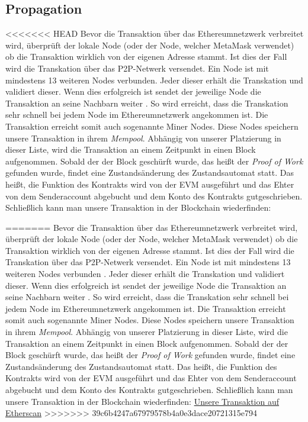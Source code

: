 \documentclass[runningheads]{llncs}
\begin{document}
\subsection{Propagation}
<<<<<<< HEAD
Bevor die Transaktion über das Ethereumnetzwerk verbreitet wird, überprüft der lokale Node (oder der Node, welcher MetaMask verwendet) ob die Transaktion wirklich von der eigenen Adresse stammt. Ist dies der Fall wird die Transkation über das P2P-Netwerk versendet. Ein Node ist mit mindestens 13 weiteren Nodes verbunden\cite[S.123]{antonopoulos_mastering_2019}. Jeder dieser erhält die Transkation und validiert dieser. Wenn dies erfolgreich ist sendet der jeweilige Node die Transaktion an seine Nachbarn weiter \cite[S.123]{antonopoulos_mastering_2019}. So wird erreicht, dass die Transkation sehr schnell bei jedem Node im Ethereumnetzwerk angekommen ist. Die Transaktion erreicht somit auch sogenannte Miner Nodes. Diese Nodes speichern unsere Transaktion in ihrem \textit{Mempool}. Abhängig von unserer Platzierung in dieser Liste, wird die Transaktion an einem Zeitpunkt in einen Block aufgenommen. Sobald der der Block geschürft wurde, das heißt der \textit{Proof of Work} gefunden wurde, findet eine Zustandsänderung des Zustandsautomat statt. Das heißt, die Funktion des Kontrakts wird von der EVM ausgeführt und das Ehter von dem Senderaccount abgebucht und dem Konto des Kontrakts gutgeschrieben. Schließlich kann man unsere Transaktion in der Blockchain wiederfinden: %

=======
Bevor die Transaktion über das Ethereumnetzwerk verbreitet wird, überprüft der lokale Node (oder der Node, welcher MetaMask verwendet) ob die Transaktion wirklich von der eigenen Adresse stammt. Ist dies der Fall wird die Transkation über das P2P-Netwerk versendet. Ein Node ist mit mindestens 13 weiteren Nodes verbunden \cite[S. 123]{antonopoulos_mastering_2019}. Jeder dieser erhält die Transkation und validiert dieser. Wenn dies erfolgreich ist sendet der jeweilige Node die Transaktion an seine Nachbarn weiter \cite[S. 123]{antonopoulos_mastering_2019}. So wird erreicht, dass die Transkation sehr schnell bei jedem Node im Ethereumnetzwerk angekommen ist. Die Transaktion erreicht somit auch sogenannte Miner Nodes. Diese Nodes speichern unsere Transaktion in ihrem \textit{Mempool}. Abhängig von unserer Platzierung in dieser Liste, wird die Transaktion an einem Zeitpunkt in einen Block aufgenommen. Sobald der der Block geschürft wurde, das heißt der \textit{Proof of Work} gefunden wurde, findet eine Zustandsänderung des Zustandsautomat statt. Das heißt, die Funktion des Kontrakts wird von der EVM ausgeführt und das Ehter von dem Senderaccount abgebucht und dem Konto des Kontrakts gutgeschrieben. Schließlich kann man unsere Transaktion in der Blockchain wiederfinden: \href{https://ropsten.etherscan.io/tx/0x6c5cd70f3464a6b68f95ba1bb7ebb5ece5a2f1ab4d45a5bb068e727e08fa827d}{Unsere Transaktion auf Etherscan}
>>>>>>> 39c6b4247a67979578b4a0e3dace20721315e794
\end{document}
